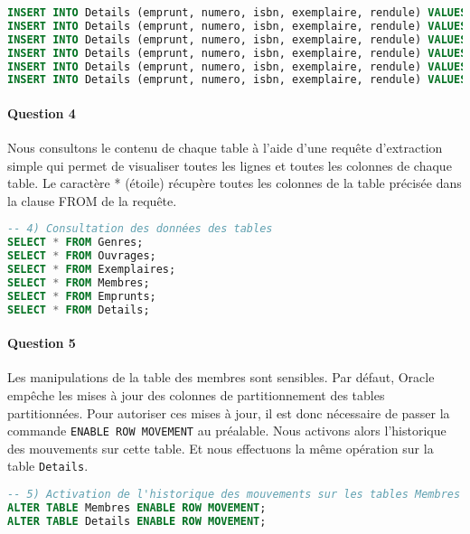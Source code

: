 \documentclass[10pt, oneside]{article}
\begin{document}
\begin{lstlisting}[language=sql, title=Question 3, label=QII3]
INSERT INTO Details (emprunt, numero, isbn, exemplaire, rendule) VALUES (16, 2, 2070367177, 2, SYSDATE-41);
INSERT INTO Details (emprunt, numero, isbn, exemplaire, rendule) VALUES (17, 1, 2877065073, 2, SYSDATE-36);
INSERT INTO Details (emprunt, numero, isbn, exemplaire, rendule) VALUES (18, 1, 2070367177, 1, SYSDATE-14);
INSERT INTO Details (emprunt, numero, isbn, exemplaire, rendule) VALUES (19, 1, 2746026090, 1, SYSDATE-12);
INSERT INTO Details (emprunt, numero, isbn, exemplaire, rendule) VALUES (20, 1, 2266091611, 1, DEFAULT);
INSERT INTO Details (emprunt, numero, isbn, exemplaire, rendule) VALUES (20, 2, 2253010219, 1, DEFAULT);
\end{lstlisting}


\paragraph{Question 4} Nous consultons le contenu de chaque table à l'aide d'une requête d'extraction simple qui permet de visualiser toutes les lignes et toutes les colonnes de chaque table. Le caractère * (étoile) récupère toutes les colonnes de la table précisée dans la clause FROM de la requête.

\begin{lstlisting}[language=sql, title=Question 4, label=QII4]
-- 4) Consultation des données des tables
SELECT * FROM Genres;
SELECT * FROM Ouvrages;
SELECT * FROM Exemplaires;
SELECT * FROM Membres;
SELECT * FROM Emprunts;
SELECT * FROM Details;
\end{lstlisting}


\paragraph{Question 5} Les manipulations de la table des membres sont sensibles. Par défaut, Oracle empêche les mises à jour des colonnes de partitionnement des tables partitionnées. Pour autoriser ces mises à jour, il est donc nécessaire de passer la commande \texttt{ENABLE ROW MOVEMENT} au préalable. Nous activons alors l'historique des mouvements sur cette table. Et nous effectuons la même opération sur la table \texttt{Details}.

\begin{lstlisting}[language=sql, title=Question 5, label=QII5]
-- 5) Activation de l'historique des mouvements sur les tables Membres et Details
ALTER TABLE Membres ENABLE ROW MOVEMENT;
ALTER TABLE Details ENABLE ROW MOVEMENT;
\end{lstlisting}
\end{document}

